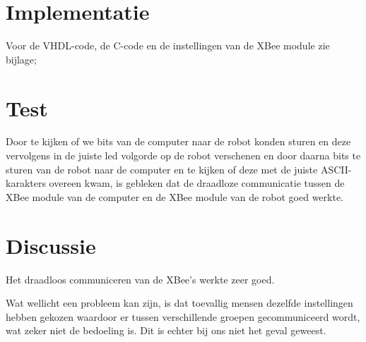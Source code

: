 \documentclass{report}
\begin{document}
\section{Implementatie}

Voor de VHDL-code, de C-code en de instellingen van de XBee module zie bijlage;

\section{Test}

Door te kijken of we bits van de computer naar de robot konden sturen en deze vervolgens in de juiste led volgorde op de robot verschenen en door daarna bits te sturen van de robot naar de computer en te kijken of deze met de juiste ASCII-karakters overeen kwam, is gebleken dat de draadloze communicatie tussen de XBee module van de computer en de XBee module van de robot goed werkte.

\section{Discussie}

Het draadloos communiceren van de XBee's werkte zeer goed.

Wat wellicht een probleem kan zijn, is dat toevallig mensen dezelfde instellingen hebben gekozen waardoor er tussen verschillende groepen gecommuniceerd wordt, wat zeker niet de bedoeling is.
Dit is echter bij ons niet het geval geweest.
\end{document}
